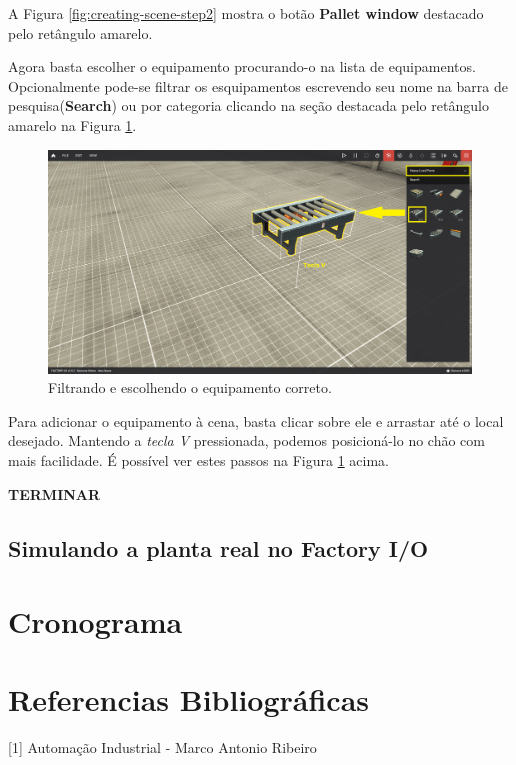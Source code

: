 \documentclass[a4paper, 12pt]{article}
\begin{document}
		A Figura \ref{fig:creating-scene-step2} mostra o botão \textbf{Pallet window} destacado pelo retângulo amarelo.
		
		Agora basta escolher o equipamento procurando-o na lista de equipamentos. Opcionalmente pode-se filtrar os esquipamentos
		escrevendo seu nome na barra de pesquisa(\textbf{Search}) ou por categoria clicando na seção destacada pelo retângulo amarelo
		na Figura \ref{fig:creating-scene-step3}.
		
		\begin{figure}[H]
			\centering
			\includegraphics[scale=0.25]{figures/creating_scene_step_3.png}
			\caption{Filtrando e escolhendo o equipamento correto.}
			\label{fig:creating-scene-step3}
		\end{figure}		
		
		Para adicionar o equipamento à cena, basta clicar sobre ele e arrastar até o local desejado. Mantendo a \textit{tecla V}
		pressionada, podemos posicioná-lo no chão com mais facilidade. É possível ver estes passos na Figura \ref{fig:creating-scene-step3} acima.
		
		\textbf{TERMINAR}
	\subsection{Simulando a planta real no Factory I/O}

\section{Cronograma}

\section{Referencias Bibliográficas}

[1] Automação Industrial - Marco Antonio Ribeiro
\end{document}

